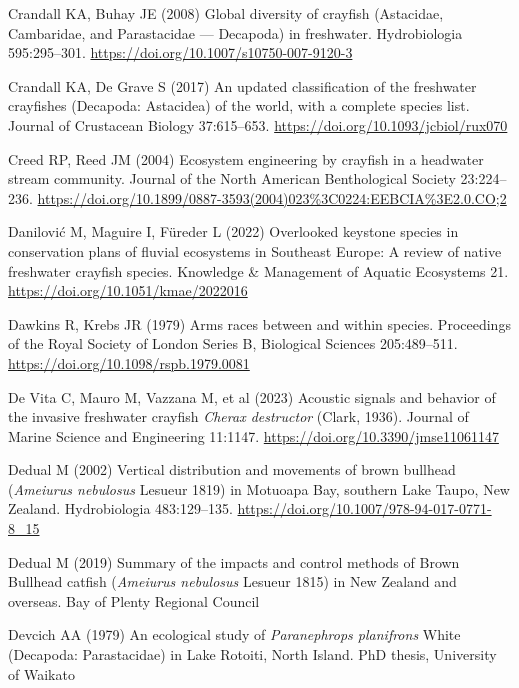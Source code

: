\documentclass[
  12pt,
  a4paper,
  oneside]{scrbook}
\newlength{\cslhangindent}
\newenvironment{CSLReferences}[2] %
 {\begin{list}{}{%
  \setlength{\itemindent}{0pt}
  \setlength{\leftmargin}{0pt}
  \setlength{\parsep}{0pt}
  \ifodd #1
   \setlength{\leftmargin}{\cslhangindent}
   \setlength{\itemindent}{-1\cslhangindent}
  \fi
  \setlength{\itemsep}{#2\baselineskip}}}
 {\end{list}}
\renewenvironment{CSLReferences}[2]
   {\begin{list}{}{%
    \setlength{\itemindent}{0pt}
    \setlength{\leftmargin}{0pt}
    \setlength{\parsep}{0pt}
    \ifodd #1
     \setlength{\leftmargin}{\cslhangindent}
     \setlength{\itemindent}{-1\cslhangindent}
    \fi
    \setlength{\itemsep}{0.3\baselineskip}}}
   {\end{list}}%
\begin{document}
\begin{CSLReferences}{1}{1}
Crandall KA, Buhay JE (2008) Global diversity of crayfish ({Astacidae,
Cambaridae}, and {Parastacidae} --- {Decapoda}) in freshwater.
Hydrobiologia 595:295--301.
\url{https://doi.org/10.1007/s10750-007-9120-3}

Crandall KA, De Grave S (2017) An updated classification of the
freshwater crayfishes ({Decapoda: Astacidea}) of the world, with a
complete species list. Journal of Crustacean Biology 37:615--653.
\url{https://doi.org/10.1093/jcbiol/rux070}

Creed RP, Reed JM (2004) Ecosystem engineering by crayfish in a
headwater stream community. Journal of the North American Benthological
Society 23:224--236.
\url{https://doi.org/10.1899/0887-3593(2004)023\%3C0224:EEBCIA\%3E2.0.CO;2}

Danilović M, Maguire I, Füreder L (2022) Overlooked keystone species in
conservation plans of fluvial ecosystems in {Southeast Europe}: A review
of native freshwater crayfish species. Knowledge \& Management of
Aquatic Ecosystems 21. \url{https://doi.org/10.1051/kmae/2022016}

Dawkins R, Krebs JR (1979) Arms races between and within species.
Proceedings of the Royal Society of London Series B, Biological Sciences
205:489--511. \url{https://doi.org/10.1098/rspb.1979.0081}

De Vita C, Mauro M, Vazzana M, et al (2023) Acoustic signals and
behavior of the invasive freshwater crayfish {\emph{Cherax destructor}}
({Clark}, 1936). Journal of Marine Science and Engineering 11:1147.
\url{https://doi.org/10.3390/jmse11061147}

Dedual M (2002) Vertical distribution and movements of brown bullhead
({\emph{Ameiurus nebulosus}} {Lesueur} 1819) in {Motuoapa Bay, southern
Lake Taupo, New Zealand}. Hydrobiologia 483:129--135.
\url{https://doi.org/10.1007/978-94-017-0771-8_15}

Dedual M (2019) Summary of the impacts and control methods of {Brown
Bullhead} catfish ({\emph{Ameiurus nebulosus}} {Lesueur} 1815) in {New
Zealand} and overseas. Bay of Plenty Regional Council

Devcich AA (1979) An ecological study of {\emph{Paranephrops
planifrons}} {White} ({Decapoda: Parastacidae}) in {Lake Rotoiti, North
Island}. PhD thesis, University of Waikato


\end{CSLReferences}
\end{document}
